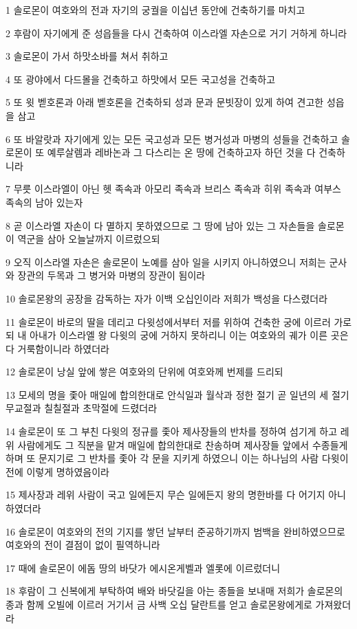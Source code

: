 \par 1 솔로몬이 여호와의 전과 자기의 궁궐을 이십년 동안에 건축하기를 마치고
\par 2 후람이 자기에게 준 성읍들을 다시 건축하여 이스라엘 자손으로 거기 거하게 하니라
\par 3 솔로몬이 가서 하맛소바를 쳐서 취하고
\par 4 또 광야에서 다드몰을 건축하고 하맛에서 모든 국고성을 건축하고
\par 5 또 윗 벧호론과 아래 벧호론을 건축하되 성과 문과 문빗장이 있게 하여 견고한 성읍을 삼고
\par 6 또 바알랏과 자기에게 있는 모든 국고성과 모든 병거성과 마병의 성들을 건축하고 솔로몬이 또 예루살렘과 레바논과 그 다스리는 온 땅에 건축하고자 하던 것을 다 건축하니라
\par 7 무릇 이스라엘이 아닌 헷 족속과 아모리 족속과 브리스 족속과 히위 족속과 여부스 족속의 남아 있는자
\par 8 곧 이스라엘 자손이 다 멸하지 못하였으므로 그 땅에 남아 있는 그 자손들을 솔로몬이 역군을 삼아 오늘날까지 이르렀으되
\par 9 오직 이스라엘 자손은 솔로몬이 노예를 삼아 일을 시키지 아니하였으니 저희는 군사와 장관의 두목과 그 병거와 마병의 장관이 됨이라
\par 10 솔로몬왕의 공장을 감독하는 자가 이백 오십인이라 저희가 백성을 다스렸더라
\par 11 솔로몬이 바로의 딸을 데리고 다윗성에서부터 저를 위하여 건축한 궁에 이르러 가로되 내 아내가 이스라엘 왕 다윗의 궁에 거하지 못하리니 이는 여호와의 궤가 이른 곳은 다 거룩함이니라 하였더라
\par 12 솔로몬이 낭실 앞에 쌓은 여호와의 단위에 여호와께 번제를 드리되
\par 13 모세의 명을 좇아 매일에 합의한대로 안식일과 월삭과 정한 절기 곧 일년의 세 절기 무교절과 칠칠절과 초막절에 드렸더라
\par 14 솔로몬이 또 그 부친 다윗의 정규를 좇아 제사장들의 반차를 정하여 섬기게 하고 레위 사람에게도 그 직분을 맡겨 매일에 합의한대로 찬송하며 제사장들 앞에서 수종들게 하며 또 문지기로 그 반차를 좇아 각 문을 지키게 하였으니 이는 하나님의 사람 다윗이 전에 이렇게 명하였음이라
\par 15 제사장과 레위 사람이 국고 일에든지 무슨 일에든지 왕의 명한바를 다 어기지 아니하였더라
\par 16 솔로몬이 여호와의 전의 기지를 쌓던 날부터 준공하기까지 범백을 완비하였으므로 여호와의 전이 결점이 없이 필역하니라
\par 17 때에 솔로몬이 에돔 땅의 바닷가 에시온게벨과 엘롯에 이르렀더니
\par 18 후람이 그 신복에게 부탁하여 배와 바닷길을 아는 종들을 보내매 저희가 솔로몬의 종과 함께 오빌에 이르러 거기서 금 사백 오십 달란트를 얻고 솔로몬왕에게로 가져왔더라

